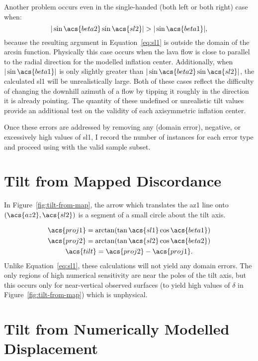 Another problem occurs even in the single-handed (both left or both right) case when:
\begin{equation}
     |\sin\acs{beta2}\sin\acs{sl2}| > |\sin\acs{beta1}|,
\end{equation}
because the resulting argument in Equation~\eqref{eq:sl1} is outside the domain of the arcsin function. Physically this case occurs when the lava flow is close to parallel to the radial direction for the modelled inflation center. Additionally, when $|\sin\acs{beta1}|$ is only slightly greater than $|\sin\acs{beta2}\sin\acs{sl2}|$, the calculated \acs{sl1} will be unrealistically large. Both of these cases reflect the difficulty of changing the downhill azimuth of a flow by tipping it roughly in the direction it is already pointing. The quantity of these undefined or unrealistic tilt values provide an additional test on the validity of each axisymmetric inflation center.

Once these errors are addressed by removing any  (domain error), negative, or excessively high values of \acs{sl1}, I record the number of instances for each error type and proceed using with the valid sample subset.

\section{Tilt from Mapped Discordance}
In Figure~\ref{fig:tilt-from-map}, the arrow which translates the \acs{az1} line onto $\left(\acs{az2},\acs{sl2}\right)$ is a segment of a small circle about the tilt axis.

\begin{gather}
    \acs{proj1} = \arctan(\tan\acs{sl1}\cos\acs{beta1})\nonumber\\
    \acs{proj2} = \arctan(\tan\acs{sl2}\cos\acs{beta2})\nonumber\\
    \acs{tilt} = \acs{proj2} - \acs{proj1}.\label{eq:tilt-from-map}
\end{gather}
Unlike Equation~\eqref{eq:sl1}, these calculations will not yield any domain errors. The only regions of high numerical sensitivity are near the poles of the tilt axis, but this occurs only for near-vertical observed surfaces (to yield high values of $\delta$ in Figure~\ref{fig:tilt-from-map}) which is unphysical. 

\section{Tilt from Numerically Modelled Displacement}


